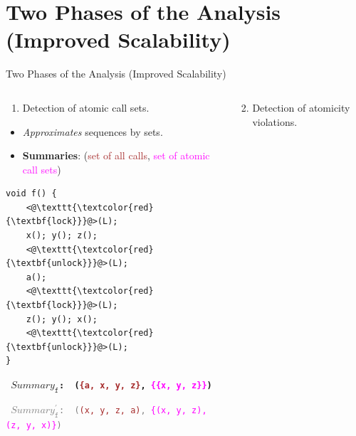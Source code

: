 \documentclass[%
    10pt, xcolor=pdflatex, hyperref={unicode}, aspectratio=169%
]{beamer}
\begin{document}
\section{Two Phases of the Analysis (Improved Scalability)}
\begin{frame}[fragile]{Two Phases of the Analysis (Improved Scalability)}
    \begin{columns}
        \begin{column}[T]{.55 \linewidth}
            \begin{enumerate}
                \item
                    Detection of \alert{atomic call sets}.
            \end{enumerate}

            \begin{itemize}
                \item
                    \emph{Approximates} \alert{sequences by sets}.

                \item
                    \textbf{Summaries}: (\textcolor{brown}{set of all
                    calls}, \textcolor{magenta}{set of atomic call sets})
            \end{itemize}

\begin{lstlisting}
void f() {
    <@\texttt{\textcolor{red}{\textbf{lock}}}@>(L); 
    x(); y(); z();
    <@\texttt{\textcolor{red}{\textbf{unlock}}}@>(L);
    a();
    <@\texttt{\textcolor{red}{\textbf{lock}}}@>(L); 
    z(); y(); x(); 
    <@\texttt{\textcolor{red}{\textbf{unlock}}}@>(L);
}
\end{lstlisting}

            \textbf{\texttt{\footnotesize
                \alert{$ Summary_\mathtt{f} $}:\,%
                (\textcolor{brown}{\{a,~x,~y,~z\}},
                \textcolor{magenta}{\{\{x,~y,~z\}\}})
            }}
            
            \textcolor{gray}{\texttt{\scriptsize
                $ Summary_\mathtt{f}^\prime $:\,%
                (\textcolor{brown}{(x,~y,~z,~a)},
                \textcolor{magenta}{\{(x,~y,~z), (z,~y,~x)\}})
            }}
        \end{column}

        \begin{column}[T]{.45 \linewidth}
            \begin{enumerate}\setcounter{enumi}{1}
                \item
                    Detection of \alert{atomicity violations}.
            \end{enumerate}


\end{column}
\end{columns}
\end{frame}
\end{document}
